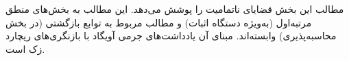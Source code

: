\documentclass[../../include/open-logic-part]{subfiles}
\begin{document}

\begin{editorial}
 مطالب این بخش قضایای ناتمامیت را پوشش می‌دهد. این مطالب به بخش‌های
 منطق مرتبه‌اول (به‌ویژه دستگاه اثبات) و مطالب مربوط به توابع بازگشتی
 (در بخش محاسبه‌پذیری) وابسته‌اند. مبنای آن یادداشت‌های جرمی آویگاد
 با بازنگری‌های ریچارد زک است.
\end{editorial}






\OLEndPartHook
\end{document}
